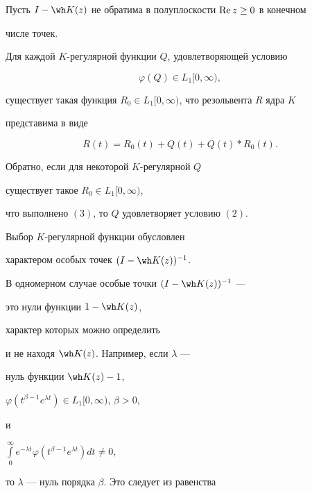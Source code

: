 \begin{lem}


Пусть $I-\wh K(z)$  не обратима в полуплоскости $\operatorname{Re} z\geq 0$ в конечном


числе точек.


Для каждой $K$-регулярной функции $Q$, удовлетворяющей условию


\begin{equation}


\varphi (Q)\in L_1[0,\infty),


\end{equation}


существует такая функция $R_0\in L_1[0,\infty)$, что резольвента $R$ ядра $K$


представима в виде


\begin{equation}


R(t)=R_0(t)+Q(t)+Q(t)*R_0(t).


\end{equation}





Обратно, если для некоторой $K$-регулярной $Q$


существует такое $R_0\in L_1[0,\infty)$,


что выполнено $(3)$, то $Q$ удовлетворяет условию $(2)$.


\end{lem}





Выбор $K$-регулярной функции обусловлен 


характером особых точек $(I-\wh K(z))^{-1}$.


В одномерном случае особые точки $(I-\wh K(z))^{-1}$ ---


это нули функции $1-\wh K(z)$,


характер которых можно определить


и не находя $\wh K(z)$. Например, если $\lambda$ ---


нуль функции $\wh K(z)-1$,


$\varphi(t^{\beta -1}e^{\lambda t})\in L_1[0,\infty)$, $\beta >0$,


и


$\int\limits_0^{\infty} e^{-\lambda t}


\varphi(t^{\beta -1}e^{\lambda t})dt\neq 0,$


то $\lambda$ --- нуль порядка $\beta$. Это следует из равенства


